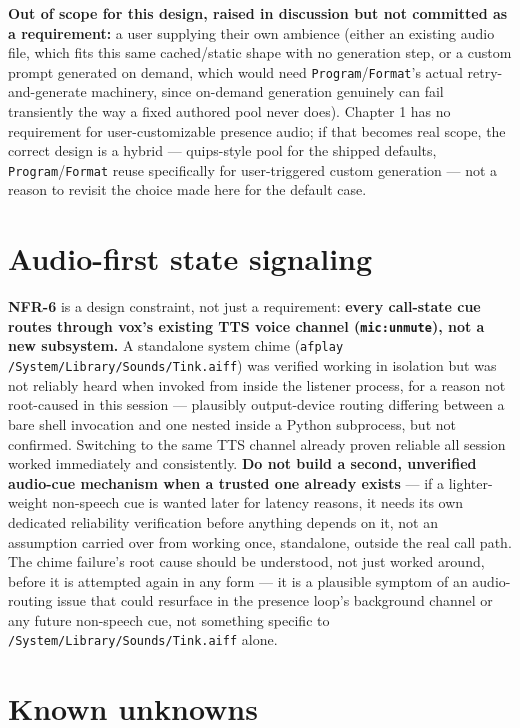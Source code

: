 \documentclass[a4paper,11pt]{report}
\newcommand{\nfr}[1]{\textbf{NFR-#1}}
\begin{document}
\textbf{Out of scope for this design, raised in discussion but not
committed as a requirement:} a user supplying their own ambience (either
an existing audio file, which fits this same cached/static shape with no
generation step, or a custom prompt generated on demand, which would
need \texttt{Program}/\texttt{Format}'s actual retry-and-generate
machinery, since on-demand generation genuinely can fail transiently the
way a fixed authored pool never does). Chapter 1 has no requirement for
user-customizable presence audio; if that becomes real scope, the
correct design is a hybrid --- quips-style pool for the shipped defaults,
\texttt{Program}/\texttt{Format} reuse specifically for user-triggered
custom generation --- not a reason to revisit the choice made here for
the default case.

\section{Audio-first state signaling}

\nfr{6} is a design constraint, not just a requirement: \textbf{every
call-state cue routes through vox's existing TTS voice channel
(\texttt{mic:unmute}), not a new subsystem.} A standalone system chime
(\texttt{afplay /System/Library/Sounds/Tink.aiff}) was verified working
in isolation but was not reliably heard when invoked from inside the
listener process, for a reason not root-caused in this session ---
plausibly output-device routing differing between a bare shell
invocation and one nested inside a Python subprocess, but not confirmed.
Switching to the same TTS channel already proven reliable all session
worked immediately and consistently. \textbf{Do not build a second,
unverified audio-cue mechanism when a trusted one already exists} ---
if a lighter-weight non-speech cue is wanted later for latency reasons,
it needs its own dedicated reliability verification before anything
depends on it, not an assumption carried over from working once,
standalone, outside the real call path. The chime failure's root cause
should be understood, not just worked around, before it is attempted
again in any form --- it is a plausible symptom of an audio-routing issue
that could resurface in the presence loop's background channel or any
future non-speech cue, not something specific to
\texttt{/System/Library/Sounds/Tink.aiff} alone.

\section{Known unknowns}
\label{sec:known-unknowns}
\end{document}

